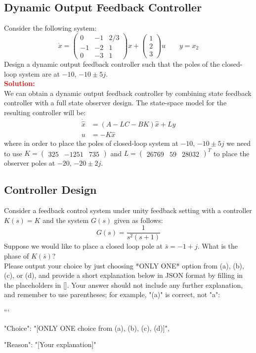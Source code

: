 \documentclass[12pt]{article}
\newcommand{\pmat}[1]{\begin{pmatrix} #1 \end{pmatrix}}
\begin{document}
\subsection{ Dynamic Output Feedback Controller}

Consider the following system:
\[
\dot{x}=\pmat{0 & -1 & 2/3 \\ -1 & -2 & 1 \\ 0 & -3 & 1 } x +\pmat{1 \\ 2 \\ 3}u \qquad y=x_2
\]
Design a dynamic output feedback controller such that the poles of the closed-loop system are at $-10$, $-10 \pm 5j$. \\

\textbf{\textcolor{red}{Solution:}} \\
We can obtain a dynamic output feedback controller by combining state feedback controller with a full state observer design. The state-space model for the resulting controller will be:
\begin{equation}
    \begin{split}
        \dot{\hat{x}} &=(A-LC-BK)\hat{x} +L y \\
        u &=-K \hat{x}
    \end{split}
\end{equation}
where in order to place the poles of closed-loop system at $-10$, $-10 \pm 5j$ we need to use $K= \pmat{325 & -1251 & 735}$ and $L=\pmat{26769 & 59 & 28032}^T$ to place the observer poles at $-20$, $-20 \pm 2j$.
\clearpage

\subsection{Controller Design}

Consider a feedback control system under unity feedback setting with a controller $K(s)=K$ and the system $G(s)$ given as follows:
\[
G(s)=\frac{1}{s^2(s+1)}
\]
Suppose we would like to place a closed loop pole at $\bar{s}=-1+j$. What is the phase of $K(\bar{s})$?  \\
Please output your choice by just choosing *ONLY ONE* option from (a), (b), (c), or (d), and provide a short explanation below in JSON format by filling in the placeholders in []. Your answer should not include any further explanation, and remember to use parentheses; for example, "(a)" is correct, not "a":

```
{

"Choice": "[ONLY ONE choice from (a), (b), (c), (d)]",

"Reason": "[Your explanation]"

}
\end{document}
